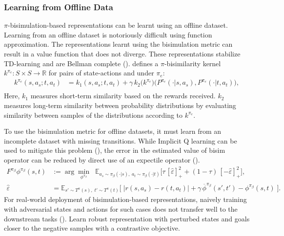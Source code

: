 \documentclass{article}
\begin{document}
\subsubsection{Learning from Offline Data}
$\pi$-bisimulation-based representations can be learnt using an offline dataset. Learning from an offline dataset is notoriously difficult using function approximation.
The representations learnt using the bisimulation metric can result in a value function that does not diverge. These representations stabilize TD-learning and are Bellman complete (\cite{pavse2024stable}). \cite{pavse2024stable} defines a $\pi$-bisimilarity kernel $k^{\pi_e} : S \times S \to \mathbb{R}$ for pairs of state-actions and under $\pi_e$:
\begin{align}
k^{\pi_e}(s,a_s; t,a_t) 
&= k_1(s,a_s; t,a_t) 
   + \gamma \, k_2\big(k^{\pi_e}\big)\big(P^{\pi_e}(\cdot|s,a_s), P^{\pi_e}(\cdot|t,a_t)\big),
\label{eq:kpi} \\[1ex]
\end{align}
Here, $k_1$ measures short-term similarity based on the rewards received. $k_2$ measures long-term similarity between probability distributions by evaluating similarity between samples of the distributions according to $k^{\pi_e}$.

To use the bisimulation metric for offline datasets, it must learn from an incomplete dataset with missing transitions. While Implicit Q learning can be used to mitigate this problem (\cite{hansen2022bisimulation}), the error in the estimated value of bisim operator can be reduced by direct use of an expectile operator (\cite{zang2023understanding}).
\begin{align}
F^{\pi_\beta} \phi^{\pi_\beta}(s, t) 
&:= \arg\min_{\phi^{\pi_\beta}} 
\;\; \mathbb{E}_{a_s \sim \pi_\beta(\cdot|s), \; a_t \sim \pi_\beta(\cdot|t)} \bigg[
    \tau \, [\hat{\varepsilon}]_+^2 
    + (1 - \tau) \, [-\hat{\varepsilon}]_+^2
\bigg], \label{eq:expectile_operator} \\
\hat{\varepsilon} 
&= \mathbb{E}_{s' \sim T^{\pi}(s), \; t' \sim T^{\pi}(t)} 
\Big[ \; \big| r(s,a_s) - r(t,a_t) \big| 
    + \gamma \, \overline{\phi}^{\pi_\beta}(s', t') 
    - \phi^{\pi_\beta}(s,t) \;\Big].
\label{eq:residual}
\end{align}
For real-world deployment of bisimulation-based representations, naively training with adversarial states and actions for such cases does not transfer well to the downstream tasks (\cite{yin2024representation}). Learn robust representation with perturbed states and goals closer to the negative samples with a contrastive objective. 
\end{document}
